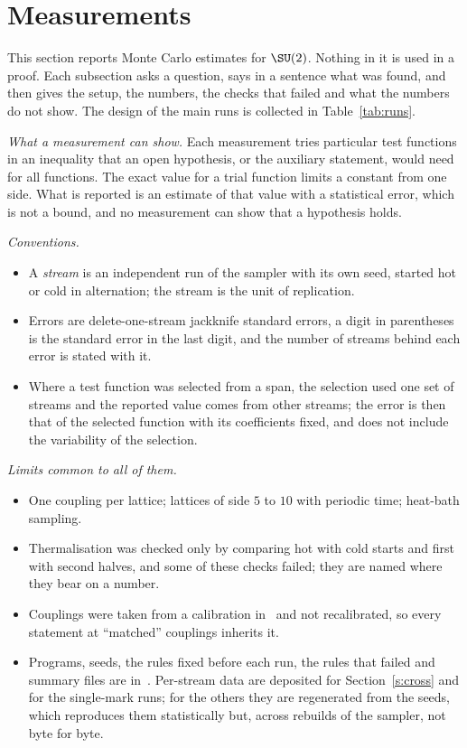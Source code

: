 \section{Measurements}\label{s:evid}
This section reports Monte Carlo estimates for $\SU(2)$. Nothing in it is used in a proof. Each subsection
asks a question, says in a sentence what was found, and then gives the setup, the numbers, the checks that
failed and what the numbers do not show. The design of the main runs is collected in Table~\ref{tab:runs}.

\emph{What a measurement can show.} Each measurement tries particular test functions in an inequality that an
open hypothesis, or the auxiliary statement, would need for all functions. The exact value for a trial
function limits a constant from one side. What is reported is an estimate of that value with a statistical
error, which is not a bound, and no measurement can show that a hypothesis holds.

\emph{Conventions.}
\begin{itemize}
\item A \emph{stream} is an independent run of the sampler with its own seed, started hot or cold in
alternation; the stream is the unit of replication.
\item Errors are delete-one-stream jackknife standard errors, a digit in parentheses is the standard error in
the last digit, and the number of streams behind each error is stated with it.
\item Where a test function was selected from a span, the selection used one set of streams and the reported
value comes from other streams; the error is then that of the selected function with its coefficients fixed,
and does not include the variability of the selection.
\end{itemize}

\emph{Limits common to all of them.}
\begin{itemize}
\item One coupling per lattice; lattices of side $5$ to $10$ with periodic time; heat-bath sampling.
\item Thermalisation was checked only by comparing hot with cold starts and first with second halves, and
some of these checks failed; they are named where they bear on a number.
\item Couplings were taken from a calibration in~\cite{RepoData} and not recalibrated, so every statement at
``matched'' couplings inherits it.
\item Programs, seeds, the rules fixed before each run, the rules that failed and summary files are
in~\cite{RepoData}. Per-stream data are deposited for Section~\ref{s:cross} and for the single-mark runs; for
the others they are regenerated from the seeds, which reproduces them statistically but, across rebuilds of
the sampler, not byte for byte.
\end{itemize}

